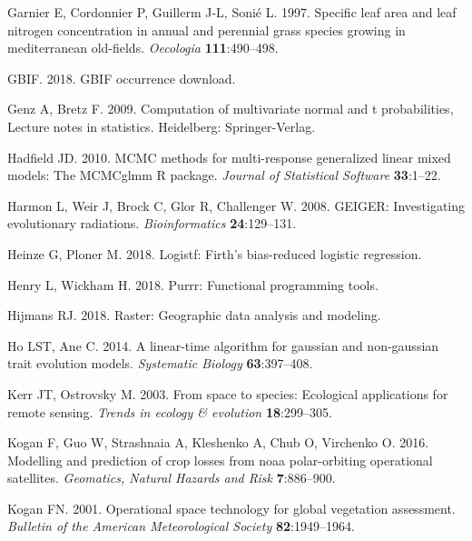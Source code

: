 \documentclass[man,floatsintext]{apa6}
\theoremstyle{definition}
\theoremstyle{definition}
\theoremstyle{definition}
\theoremstyle{remark}
\begin{document}
\leavevmode\hypertarget{ref-garnier1997specific}{}%
Garnier E, Cordonnier P, Guillerm J-L, Sonié L. 1997. Specific leaf area
and leaf nitrogen concentration in annual and perennial grass species
growing in mediterranean old-fields. \emph{Oecologia}
\textbf{111}:490--498.

\leavevmode\hypertarget{ref-gbifdownload}{}%
GBIF. 2018. GBIF occurrence download.

\leavevmode\hypertarget{ref-R-mvtnorm}{}%
Genz A, Bretz F. 2009. Computation of multivariate normal and t
probabilities, Lecture notes in statistics. Heidelberg: Springer-Verlag.

\leavevmode\hypertarget{ref-R-MCMCglmm}{}%
Hadfield JD. 2010. MCMC methods for multi-response generalized linear
mixed models: The MCMCglmm R package. \emph{Journal of Statistical
Software} \textbf{33}:1--22.

\leavevmode\hypertarget{ref-R-geiger_d}{}%
Harmon L, Weir J, Brock C, Glor R, Challenger W. 2008. GEIGER:
Investigating evolutionary radiations. \emph{Bioinformatics}
\textbf{24}:129--131.

\leavevmode\hypertarget{ref-R-logistf}{}%
Heinze G, Ploner M. 2018. Logistf: Firth's bias-reduced logistic
regression.

\leavevmode\hypertarget{ref-R-purrr}{}%
Henry L, Wickham H. 2018. Purrr: Functional programming tools.

\leavevmode\hypertarget{ref-R-raster}{}%
Hijmans RJ. 2018. Raster: Geographic data analysis and modeling.

\leavevmode\hypertarget{ref-R-phylolm}{}%
Ho LST, Ane C. 2014. A linear-time algorithm for gaussian and
non-gaussian trait evolution models. \emph{Systematic Biology}
\textbf{63}:397--408.

\leavevmode\hypertarget{ref-kerr2003space}{}%
Kerr JT, Ostrovsky M. 2003. From space to species: Ecological
applications for remote sensing. \emph{Trends in ecology \& evolution}
\textbf{18}:299--305.

\leavevmode\hypertarget{ref-kogan2016modelling}{}%
Kogan F, Guo W, Strashnaia A, Kleshenko A, Chub O, Virchenko O. 2016.
Modelling and prediction of crop losses from noaa polar-orbiting
operational satellites. \emph{Geomatics, Natural Hazards and Risk}
\textbf{7}:886--900.

\leavevmode\hypertarget{ref-kogan2001operational}{}%
Kogan FN. 2001. Operational space technology for global vegetation
assessment. \emph{Bulletin of the American Meteorological Society}
\textbf{82}:1949--1964.
\end{document}
